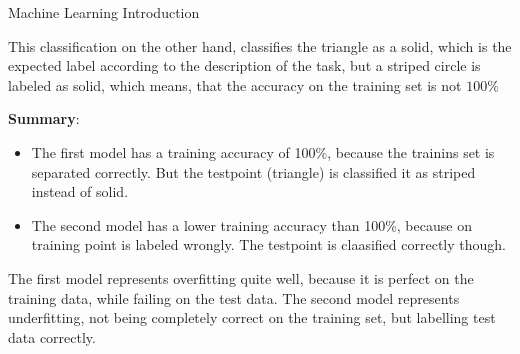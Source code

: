 \documentclass[
	english,
        solution=true
	]{tudaexercise}
\begin{document}
\begin{task}[points=6]{Machine Learning Introduction}
\begin{subtask}[points=6,title=Model Fitting]
\begin{solution}
This classification on the other hand, classifies the triangle as a solid, which is the expected label according to the description of the task, but a striped circle is labeled as solid, which means, that the accuracy on the training set is not $100\%$

\textbf{Summary}:
\begin{itemize}
    \item The first model has a training accuracy of 100\%, because the trainins set is separated correctly. But the testpoint (triangle) is classified it as striped instead of solid.
    \item The second model has a lower training accuracy than 100\%, because on training point is labeled wrongly. The testpoint is claasified correctly though.
\end{itemize}

The first model represents overfitting quite well, because it is perfect on the training data, while failing on the test data. The second model represents underfitting, not being completely correct on the training set, but labelling test data correctly.

\end{solution}
\end{subtask}
\end{task}

\newpage
\end{document}
